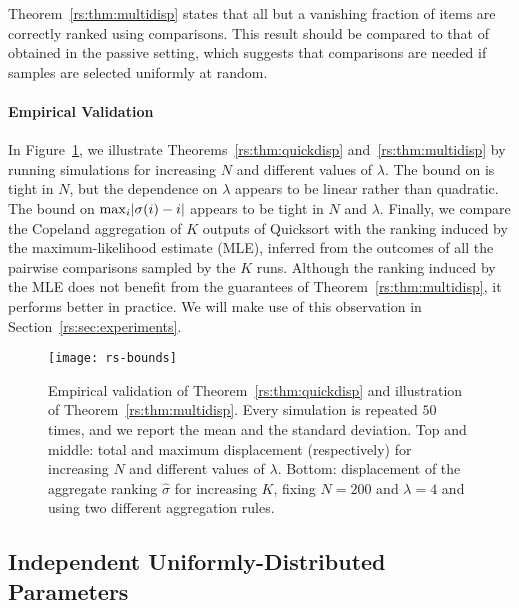 Theorem~\ref{rs:thm:multidisp} states that all but a vanishing fraction of items are correctly ranked using  comparisons.
This result should be compared to that of \citet{rajkumar2014statistical} obtained in the passive setting, which suggests that  comparisons are needed if samples are selected uniformly at random.

\paragraph{Empirical Validation}

In Figure~\ref{rs:fig:bounds}, we illustrate Theorems~\ref{rs:thm:quickdisp} and~\ref{rs:thm:multidisp} by running simulations for increasing $N$ and different values of $\lambda$.
The bound on \Disp{\sigma} is tight in $N$, but the dependence on $\lambda$ appears to be linear rather than quadratic.
The bound on $\max_i \lvert\sigma(i) - i\rvert$ appears to be tight in $N$ and $\lambda$.
Finally, we compare the Copeland aggregation of $K$ outputs of Quicksort with the ranking induced by the maximum-likelihood estimate (MLE), inferred from the outcomes of all the pairwise comparisons sampled by the $K$ runs.
Although the ranking induced by the MLE does not benefit from the guarantees of Theorem~\ref{rs:thm:multidisp}, it performs better in practice.
We will make use of this observation in Section~\ref{rs:sec:experiments}.

\begin{figure}[p]
\centering
\texttt{[image: rs-bounds]}
\caption{
Empirical validation of Theorem~\ref{rs:thm:quickdisp} and illustration of Theorem~\ref{rs:thm:multidisp}.
Every simulation is repeated $50$ times, and we report the mean and the standard deviation.
Top and middle: total and maximum displacement (respectively) for increasing $N$ and different values of $\lambda$.
Bottom: displacement of the aggregate ranking $\hat{\sigma}$ for increasing $K$, fixing $N = \num{200}$ and $\lambda = \num{4}$ and using two different aggregation rules.
}
\label{rs:fig:bounds}
\end{figure}


\subsection{Independent Uniformly-Distributed Parameters}
\label{rs:sec:iidunif}

